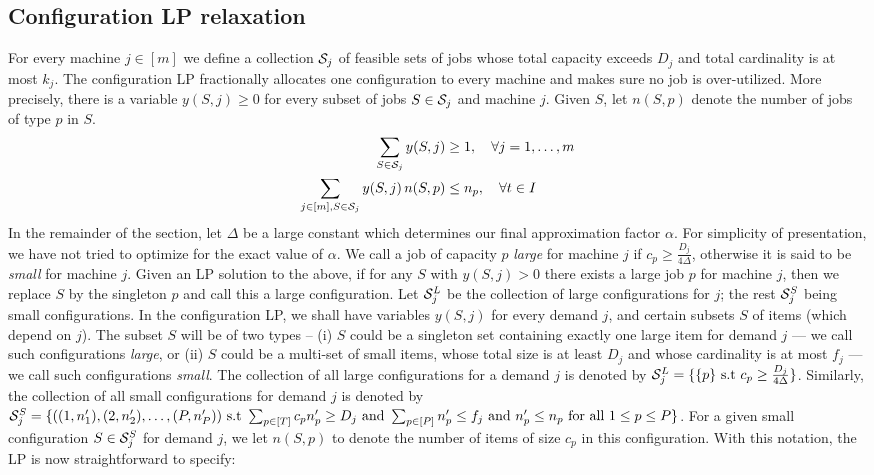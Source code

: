 \subsection{Configuration LP relaxation}
For every machine $j\in [m]$ we define a collection ${\cal S}_j$ of feasible sets of jobs whose total capacity exceeds $D_j$ and total cardinality is at most $k_j$.
The configuration LP fractionally allocates one configuration to every machine and makes sure no job is over-utilized.
More precisely, there is a variable $y(S,j)\ge 0$ for every subset of jobs $S\in {\cal S}_j$ and machine $j$. Given $S$, let $n(S,p)$ denote the number of jobs of type $p$ in $S$.
\begin{align}
	\label{eq:config1}
	\sum_{S \in \calS_j} y(S,j) & \geq 1, \ \ \ \forall j=1, \ldots, m \\
	\label{eq:config2}
	\sum_{j \in [m], S \in \calS_j} y(S,j) \, n(S,p) & \leq n_p, \ \ \ \forall t  \in I 
\end{align}
In the remainder of the section,  let $\Delta$ be a large constant which determines our final approximation factor $\alpha$. For simplicity of  presentation, we have not tried to optimize for the exact value of $\alpha$. %
We call a job of capacity $p$ {\em large} for machine $j$ if $c_p \geq \frac{D_j}{4\Delta}$, otherwise it is said to be \emph{small} for machine $j$. 
Given an LP solution to the above, if for any $S$ with $y(S,j) > 0$ there exists a large job $p$ for machine $j$, then we replace $S$ by the singleton $p$ and call this a large configuration.
Let ${\cal S}^L_j$ be the collection of large configurations for $j$; the rest ${\cal S}^S_j$ being small configurations.
\iffalse
In the configuration LP, we shall have variables $y(S,j)$ for every demand $j$, and certain subsets $S$ of items (which depend on $j$).
The subset $S$ will be of two types -- (i) $S$ could be a singleton set containing exactly one large item for demand $j$ --- we call such configurations {\em large}, or (ii) $S$ could be a multi-set of small items, whose total size is at least $D_j$ and whose cardinality is at most $f_j$ --- we call such configurations {\em small}. The collection of all large configurations for a demand $j$ is denoted by ${\cal S}^L_j = \{ \{p\} \text{ s.t } c_p \geq \frac{D_j}{4 \Delta}  \}$. Similarly, the collection of all small configurations for demand $j$ is denoted by ${\cal S}^S_j = \{ ((1,n'_1), (2,n'_2), \ldots, (P,n'_P)) \text{ s.t } \sum_{p \in [T]} c_p n'_p \geq D_j \text{ and } \sum_{p \in [P]} n'_p \leq f_j \text{ and } n'_p \leq n_p \text{ for all } 1 \leq p \leq P \}$. For a given small configuration $S \in {\cal S}^S_j$ for demand $j$, we let $n(S,p)$ to denote the number of items of size $c_p$ in this configuration. With this notation, the LP is now straightforward to specify:

